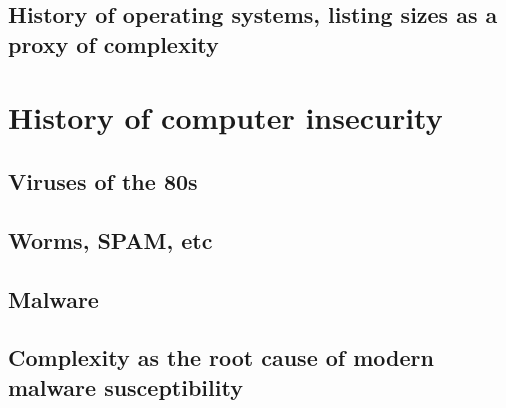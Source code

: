\subsection{History of operating systems, listing sizes as a proxy of complexity}


\section{History of computer insecurity}


\subsection{Viruses of the 80s}


\subsection{Worms, SPAM, etc}


\subsection{Malware}


\subsection{Complexity as the root cause of modern malware susceptibility}